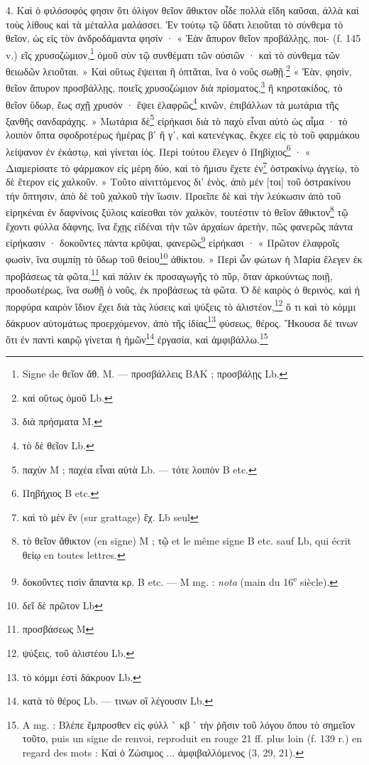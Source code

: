 \documentclass[landscape, a4paper, 11pt, oneside, polutonikogreek, french]{article}
\begin{document}
4. Καὶ ὁ φιλόσοφός φησιν ὅτι ὀλίγον θεῖον ἄθικτον οἶδε πολλὰ εἴδη καῦσαι, ἀλλὰ καὶ τοὺς λίθους καὶ τὰ μέταλλα μαλάσσει. Ἐν τούτῳ τῷ ὕδατι λειοῦται τὸ σύνθεμα τὸ θεῖον, ὡς εἰς τὸν ἀνδροδάμαντα φησίν · « Ἐὰν ἄπυρον θεῖον προβάλλῃς, ποι- (f. 145 v.) εῖς χρυσοζώμιον,\footnote{Signe de θεῖον ἄθ. M. --- προσβάλλεις BAK ; προσβάλῃς Lb.} ὁμοῦ σὺν τῷ συνθέματι τῶν οὐσιῶν · καὶ τὸ σύνθεμα τῶν θειωδῶν λειοῦται. » Καὶ οὕτως ἕψειται ἢ ὀπτᾶται, ἵνα ὁ νοῦς σωθῇ.\footnote{καὶ οὕτως ὁμοῦ Lb.} « Ἐὰν, φησὶν, θεῖον ἄπυρον προσβάλλῃς, ποιεῖς χρυσοζώμιον διὰ πρίσματος,\footnote{διὰ πρήσματα M.} ἢ κηροτακίδος, τὸ θεῖον ὕδωρ, ἕως σχῇ χρυσόν · ἕψει ἐλαφρῶς\footnote{τὸ δὲ θεῖον Lb.} κινῶν, ἐπιβάλλων τὰ μωτάρια τῆς ξανθῆς σανδαράχης. » Μωτάρια δὲ\footnote{παχὺν M ; παχέα εἶναι αὐτὰ Lb. --- τότε λοιπὸν B etc.} εἰρήκασι διὰ τὸ παχὺ εἶναι αὐτὸ ὡς αἷμα · τὸ λοιπὸν ὄπτα σφοδροτέρως ἡμέρας βʹ ἢ γʹ, καὶ κατενέγκας, ἔκχεε εἰς τὸ τοῦ φαρμάκου λείψανον ἐν ἑκάστῳ, καὶ γίνεται ἰός. Περὶ τούτου ἔλεγεν ὁ Πηβίχιος\footnote{Πηβήχιος B etc.} · « Διαμερίσατε τὸ φάρμακον εἰς μέρη δύο, καὶ τὸ ἤμισυ ἔχετε ἐν\footnote{καὶ τὸ μὲν ἓν (sur grattage) ἒχ. Lb seul} ὀστρακίνῳ ἀγγείῳ, τὸ δὲ ἕτερον εἰς χαλκοῦν. » Τοῦτο αἰνιττόμενος δι' ἑνὸς, ἀπὸ μέν [τοι] τοῦ ὀστρακίνου τὴν ὄπτησιν, ἀπὸ δὲ τοῦ χαλκοῦ τὴν ἴωσιν. Προεῖπε δὲ καὶ τὴν λεύκωσιν ἀπὸ τοῦ εἰρηκέναι ἐν δαφνίνοις ξύλοις καίεσθαι τὸν χαλκὸν, τουτέστιν τὸ θεῖον ἄθικτον\footnote{τὸ θεῖον ἄθικτον (en signe) M ; τῷ et le même signe B etc. sauf Lb, qui écrit θείῳ en toutes lettres.} τῷ ἔχοντι φύλλα δάφνης, ἵνα ἔχῃς εἰδέναι τὴν τῶν ἀρχαίων ἀρετὴν, πῶς φανερῶς πάντα εἰρήκασιν · δοκοῦντες πάντα κρῦψαι, φανερῶς\footnote{δοκοῦντες τισὶν ἅπαντα κρ. B etc. --- M mg. : \emph{nota} (main du 16\textsuperscript{e} siècle).} εἰρήκασι · « Πρῶτον ἐλαφροῖς φωσὶν, ἵνα συμπίῃ τὸ ὕδωρ τοῦ θείου\footnote{δεῖ δὲ πρῶτον Lb} ἀθίκτου. » Περὶ ὧν φώτων ἡ Μαρία ἔλεγεν ἐκ προβάσεως τὰ φῶτα,\footnote{προσβάσεως M} καὶ πάλιν ἐκ προσαγωγῆς τὸ πῦρ, ὅταν ἀρκούντως ποιῇ, προοδωτέρως, ἵνα σωθῇ ὁ νοῦς, ἐκ προβάσεως τὰ φῶτα. Ὁ δὲ καιρὸς ὁ θερινὸς, καὶ ἡ πορφύρα καιρὸν ἴδιον ἔχει διὰ τὰς λύσεις καὶ ψύξεις τὸ ἁλιστέον,\footnote{ψύξεις, τοῦ ἁλιστέου Lb.} ὅ τι καὶ τὸ κόμμι δάκρυον αὐτομάτως προερχόμενον, ἀπὸ τῆς ἰδίας\footnote{τὸ κόμμι ἐστὶ δάκρυον Lb.} φύσεως, θέρος. Ἤκουσα δέ τινων ὅτι ἐν παντὶ καιρῷ γίνεται ἡ ἡμῶν\footnote{κατὰ τὸ θέρος Lb. --- τινων οἳ λέγουσιν Lb.} ἐργασία, καὶ ἀμφιβάλλω.\footnote{A mg. : Βλέπε ἔμπροσθεν εἰς φύλλ ` κβ ʹ τὴν ῥῆσιν τοῦ λόγου ὅπου τὸ σημεῖον τοῦτο, puis un signe de renvoi, reproduit en rouge 21 ff. plus loin (f. 139 r.) en regard des mots : Καὶ ὁ Ζώσιμος ... ἀμφιβαλλόμενος (3, 29, 21).}
\clearpage
\bigskip
\centerline{\EightStarTaper}
\centerline{\EightStarTaper\EightStarTaper}
\bigskip
\end{document}
